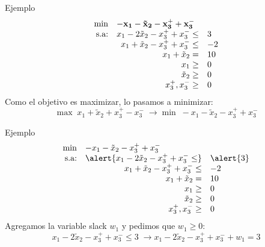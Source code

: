 \documentclass[10pt, aspectratio=169]{beamer}
\begin{document}
    \begin{frame}{Ejemplo}
        \[\begin{array}{rrl}
              \mathbf{\min} & \multicolumn{2}{l}{\mathbf{-x_1 - \tilde{x}_2 - x_3^++x_3^-}} \\
              \text{s.a:} & x_1 - 2\tilde{x}_2 - x_3^++x_3^- \leq & 3  \\
              & x_1 + \tilde{x}_2 - x_3^++x_3^- \leq  & -2 \\
              & x_1 + \tilde{x}_2 =                   & 10 \\
              & x_1\geq                               & 0  \\
              & \tilde{x}_2 \geq                      & 0  \\
              & x_3^+ ,x_3^- \geq                     & 0
        \end{array}
        \]
        Como el objetivo es maximizar, lo pasamos a minimizar:
        \[ \max \; x_1 + \tilde{x}_2 + x_3^+-x_3^- \; \rightarrow \min \; -x_1 - \tilde{x}_2 - x_3^++x_3^-\]

    \end{frame}


    \begin{frame}{Ejemplo}
        \[\begin{array}{rrl}
              \min & \multicolumn{2}{l}{-x_1 - \tilde{x}_2 - x_3^++x_3^-} \\
              \text{s.a:} & \alert{x_1 - 2\tilde{x}_2 - x_3^++x_3^- \leq} & \alert{3} \\
              & x_1 + \tilde{x}_2 - x_3^++x_3^- \leq          & -2        \\
              & x_1 + \tilde{x}_2 =                           & 10        \\
              & x_1\geq                                       & 0         \\
              & \tilde{x}_2 \geq                              & 0         \\
              & x_3^+ ,x_3^- \geq                             & 0
        \end{array}
        \]
        Agregamos la variable slack $w_1$ y pedimos que $w_1\geq 0$:
        \[ x_1 - 2\tilde{x}_2 - x_3^++x_3^- \leq 3 \; \rightarrow x_1 - 2\tilde{x}_2 - x_3^++x_3^- + w_1 = 3 \]
    \end{frame}
\end{document}
